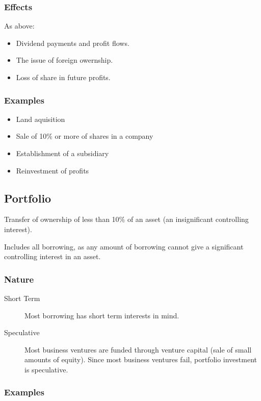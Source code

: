\documentclass[a4paper,11pt]{report}
\begin{document}
\subsubsection{Effects}

As above:

\begin{itemize}
\item Dividend payments and profit flows.
\item The issue of foreign owernship.
\item Loss of share in future profits.
\end{itemize}

\subsubsection{Examples}

\begin{itemize}
\item Land aquisition
\item Sale of 10\% or more of shares in a company
\item Establishment of a subsidiary
\item Reinvestment of profits
\end{itemize}

\subsection{Portfolio}

Transfer of ownership of less than 10\% of an asset (an insignificant
controlling interest).

Includes all borrowing, as any amount of borrowing cannot give a significant
controlling interest in an asset.

\subsubsection{Nature}

\begin{description}
\item [Short Term] Most borrowing has short term interests in mind.
\item [Speculative] Most business ventures are funded through venture capital
	(sale of small amounts of equity). Since most business ventures fail,
	portfolio investment is speculative.
\end{description}

\subsubsection{Examples}
\end{document}
